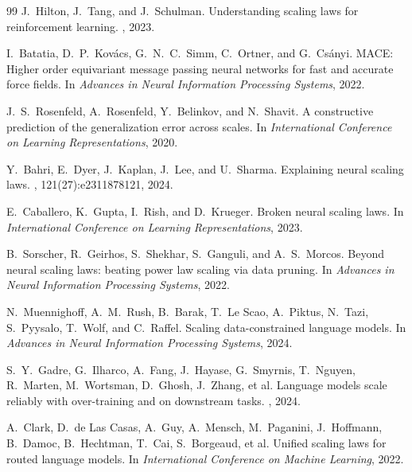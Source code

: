 \documentclass[12pt,a4paper]{article}
\theoremstyle{remark}
\begin{document}
\begin{thebibliography}{99}
J.\ Hilton, J.\ Tang, and J.\ Schulman.
\newblock Understanding scaling laws for reinforcement learning.
, 2023.

I.\ Batatia, D.\ P.\ Kov\'{a}cs, G.\ N.\ C.\ Simm, C.\ Ortner, and G.\ Cs\'{a}nyi.
\newblock MACE: Higher order equivariant message passing neural networks for fast and accurate force fields.
\newblock In {\em Advances in Neural Information Processing Systems}, 2022.

J.\ S.\ Rosenfeld, A.\ Rosenfeld, Y.\ Belinkov, and N.\ Shavit.
\newblock A constructive prediction of the generalization error across scales.
\newblock In {\em International Conference on Learning Representations}, 2020.

Y.\ Bahri, E.\ Dyer, J.\ Kaplan, J.\ Lee, and U.\ Sharma.
\newblock Explaining neural scaling laws.
, 121(27):e2311878121, 2024.

E.\ Caballero, K.\ Gupta, I.\ Rish, and D.\ Krueger.
\newblock Broken neural scaling laws.
\newblock In {\em International Conference on Learning Representations}, 2023.

B.\ Sorscher, R.\ Geirhos, S.\ Shekhar, S.\ Ganguli, and A.\ S.\ Morcos.
\newblock Beyond neural scaling laws: beating power law scaling via data pruning.
\newblock In {\em Advances in Neural Information Processing Systems}, 2022.

N.\ Muennighoff, A.\ M.\ Rush, B.\ Barak, T.\ Le Scao, A.\ Piktus, N.\ Tazi, S.\ Pyysalo, T.\ Wolf, and C.\ Raffel.
\newblock Scaling data-constrained language models.
\newblock In {\em Advances in Neural Information Processing Systems}, 2024.

S.\ Y.\ Gadre, G.\ Ilharco, A.\ Fang, J.\ Hayase, G.\ Smyrnis, T.\ Nguyen, R.\ Marten, M.\ Wortsman, D.\ Ghosh, J.\ Zhang, et al.
\newblock Language models scale reliably with over-training and on downstream tasks.
, 2024.

A.\ Clark, D.\ de Las Casas, A.\ Guy, A.\ Mensch, M.\ Paganini, J.\ Hoffmann, B.\ Damoc, B.\ Hechtman, T.\ Cai, S.\ Borgeaud, et al.
\newblock Unified scaling laws for routed language models.
\newblock In {\em International Conference on Machine Learning}, 2022.


\end{thebibliography}
\end{document}
